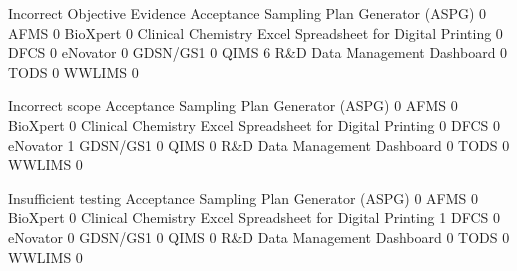 \documentclass{article}
\begin{document}
\begin{Schunk}
\begin{Soutput}
                                                            Incorrect Objective Evidence
  Acceptance Sampling Plan Generator (ASPG)                                            0
  AFMS                                                                                 0
  BioXpert                                                                             0
  Clinical Chemistry Excel Spreadsheet for Digital Printing                            0
  DFCS                                                                                 0
  eNovator                                                                             0
  GDSN/GS1                                                                             0
  QIMS                                                                                 6
  R&D Data Management Dashboard                                                        0
  TODS                                                                                 0
  WWLIMS                                                                               0
                                                           
                                                            Incorrect scope
  Acceptance Sampling Plan Generator (ASPG)                               0
  AFMS                                                                    0
  BioXpert                                                                0
  Clinical Chemistry Excel Spreadsheet for Digital Printing               0
  DFCS                                                                    0
  eNovator                                                                1
  GDSN/GS1                                                                0
  QIMS                                                                    0
  R&D Data Management Dashboard                                           0
  TODS                                                                    0
  WWLIMS                                                                  0
                                                           
                                                            Insufficient testing
  Acceptance Sampling Plan Generator (ASPG)                                    0
  AFMS                                                                         0
  BioXpert                                                                     0
  Clinical Chemistry Excel Spreadsheet for Digital Printing                    1
  DFCS                                                                         0
  eNovator                                                                     0
  GDSN/GS1                                                                     0
  QIMS                                                                         0
  R&D Data Management Dashboard                                                0
  TODS                                                                         0
  WWLIMS                                                                       0
                                                           

\end{Soutput}
\end{Schunk}
\end{document}
